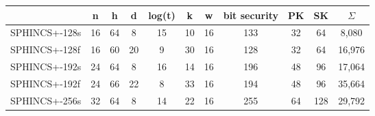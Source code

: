 \documentclass[a4paper,12pt]{article}
\begin{document}
\begin{table}[]
\centering
\begin{tabular}{@{}lcccccccccc@{}}
\toprule
\textbf{}     & \multicolumn{1}{c}{\textbf{n}} & \multicolumn{1}{c}{\textbf{h}} & \multicolumn{1}{c}{\textbf{d}} & \multicolumn{1}{c}{\textbf{log(t)}} & \multicolumn{1}{c}{\textbf{k}} & \multicolumn{1}{c}{\textbf{w}} & \multicolumn{1}{c}{\textbf{bit security}} & \multicolumn{1}{c}{\textbf{PK}} & \multicolumn{1}{c}{\textbf{SK}} & \multicolumn{1}{c}{\textbf{$\Sigma$}} \\ \midrule
SPHINCS+-128s & 16                             & 64                             & 8                              & 15                                  & 10                             & 16                             & 133                                       & 32                              & 64                              & 8,080                            \\
SPHINCS+-128f & 16                             & 60                             & 20                             & 9                                   & 30                             & 16                             & 128                                       & 32                              & 64                              & 16,976                           \\
SPHINCS+-192s & 24                             & 64                             & 8                              & 16                                  & 14                             & 16                             & 196                                       & 48                              & 96                              & 17,064                           \\
SPHINCS+-192f & 24                             & 66                             & 22                             & 8                                   & 33                             & 16                             & 194                                       & 48                              & 96                              & 35,664                           \\
SPHINCS+-256s & 32                             & 64                             & 8                              & 14                                  & 22                             & 16                             & 255                                       & 64                              & 128                             & 29,792                           \\

\end{tabular}
\end{table}
\end{document}
